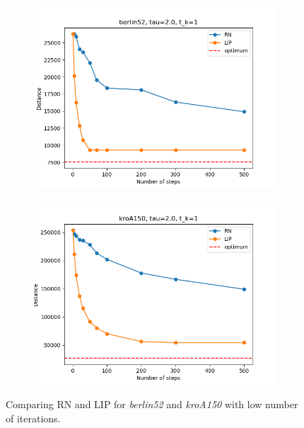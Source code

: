 \begin{figure}[!htb]
	\centering
	\begin{subfigure}{0.45\textwidth}
		\includegraphics[width=\textwidth]{img/berlin52_temp=2.0_cool=1.0_low_iter}
	\end{subfigure}
	\begin{subfigure}{0.45\textwidth}
		\includegraphics[width=\textwidth]{img/kroA150_temp=2.0_cool=1.0_low_iter}
	\end{subfigure}
	\caption{Comparing RN and LIP for \textit{berlin52} and \textit{kroA150} with low number of iterations.}
\end{figure}